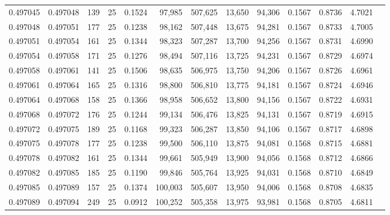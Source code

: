 \begin{tabular}{rrrrrrrrrrrrr}
0.497045 & 0.497048 & 139 &  25 &                                     0.1524 &  97,985 & 507,625 &  13,650 &  94,306 & 0.1567 & 0.8736 & 4.7021 \\
0.497048 & 0.497051 & 177 &  25 &                                     0.1238 &  98,162 & 507,448 &  13,675 &  94,281 & 0.1567 & 0.8733 & 4.7005 \\
0.497051 & 0.497054 & 161 &  25 &                                     0.1344 &  98,323 & 507,287 &  13,700 &  94,256 & 0.1567 & 0.8731 & 4.6990 \\
0.497054 & 0.497058 & 171 &  25 &                                     0.1276 &  98,494 & 507,116 &  13,725 &  94,231 & 0.1567 & 0.8729 & 4.6974 \\
0.497058 & 0.497061 & 141 &  25 &                                     0.1506 &  98,635 & 506,975 &  13,750 &  94,206 & 0.1567 & 0.8726 & 4.6961 \\
0.497061 & 0.497064 & 165 &  25 &                                     0.1316 &  98,800 & 506,810 &  13,775 &  94,181 & 0.1567 & 0.8724 & 4.6946 \\
0.497064 & 0.497068 & 158 &  25 &                                     0.1366 &  98,958 & 506,652 &  13,800 &  94,156 & 0.1567 & 0.8722 & 4.6931 \\
0.497068 & 0.497072 & 176 &  25 &                                     0.1244 &  99,134 & 506,476 &  13,825 &  94,131 & 0.1567 & 0.8719 & 4.6915 \\
0.497072 & 0.497075 & 189 &  25 &                                     0.1168 &  99,323 & 506,287 &  13,850 &  94,106 & 0.1567 & 0.8717 & 4.6898 \\
0.497075 & 0.497078 & 177 &  25 &                                     0.1238 &  99,500 & 506,110 &  13,875 &  94,081 & 0.1568 & 0.8715 & 4.6881 \\
0.497078 & 0.497082 & 161 &  25 &                                     0.1344 &  99,661 & 505,949 &  13,900 &  94,056 & 0.1568 & 0.8712 & 4.6866 \\
0.497082 & 0.497085 & 185 &  25 &                                     0.1190 &  99,846 & 505,764 &  13,925 &  94,031 & 0.1568 & 0.8710 & 4.6849 \\
0.497085 & 0.497089 & 157 &  25 &                                     0.1374 & 100,003 & 505,607 &  13,950 &  94,006 & 0.1568 & 0.8708 & 4.6835 \\
0.497089 & 0.497094 & 249 &  25 &                                     0.0912 & 100,252 & 505,358 &  13,975 &  93,981 & 0.1568 & 0.8705 & 4.6811 \\

\end{tabular}
